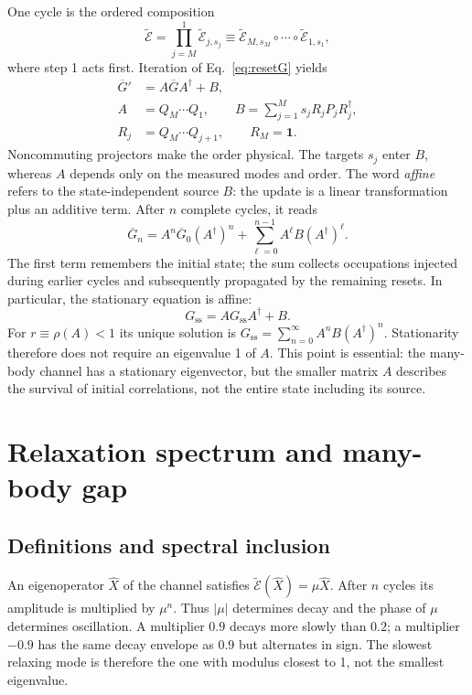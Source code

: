 \documentclass[aps,prb,onecolumn,nofootinbib,superscriptaddress,floatfix]{revtex4-2}
\newcommand{\id}{\mathbf 1}
\newcommand{\E}{\widetilde{\mathcal E}}
\newcommand{\steady}{\mathrm{ss}}
\begin{document}
One cycle is the ordered composition
\begin{equation}
 \E=\prod_{j=M}^{1}\E_{j,s_j}
   \equiv\E_{M,s_M}\circ\cdots\circ\E_{1,s_1},
 \label{eq:product}
\end{equation}
where step 1 acts first. Iteration of Eq.~\eqref{eq:resetG} yields
\begin{align}
 \overline G'&=A\overline GA^\dagger+B,\nonumber\\
 A&=Q_M\cdots Q_1,\qquad
 B=\sum_{j=1}^{M}s_jR_jP_jR_j^\dagger,\nonumber\\
 R_j&=Q_M\cdots Q_{j+1},\qquad R_M=\id.
 \label{eq:affine}
\end{align}
Noncommuting projectors make the order physical. The targets $s_j$
enter $B$, whereas $A$ depends only on the measured modes and order.
The word \emph{affine} refers to the state-independent source $B$:
the update is a linear transformation plus an additive term.
After $n$ complete cycles, it reads
\begin{equation}
 \overline G_n=A^n\overline G_0(A^\dagger)^n+
       \sum_{\ell=0}^{n-1}A^\ell B(A^\dagger)^\ell .
 \label{eq:finite_cycles}
\end{equation}
The first term remembers the initial state; the sum collects
occupations injected during earlier cycles and subsequently
propagated by the remaining resets.
In particular, the stationary equation is affine:
\begin{equation}
 G_\steady=AG_\steady A^\dagger+B. \label{eq:fixedG}
\end{equation}
For $r\equiv\rho(A)<1$ its unique solution is
$G_\steady=\sum_{n=0}^{\infty}A^nB(A^\dagger)^n$.
Stationarity therefore does not require an eigenvalue 1 of $A$.
This point is essential: the many-body channel has a stationary
eigenvector, but the smaller matrix $A$ describes the survival of
initial correlations, not the entire state including its source.

\section{Relaxation spectrum and many-body gap}
\label{sec:spectrum}
\subsection{Definitions and spectral inclusion}
An eigenoperator $\hat X$ of the channel satisfies
$\E(\hat X)=\mu\hat X$. After $n$ cycles its amplitude is multiplied
by $\mu^n$. Thus $|\mu|$ determines decay and the phase of $\mu$
determines oscillation. A multiplier $0.9$ decays more slowly than
$0.2$; a multiplier $-0.9$ has the same decay envelope as $0.9$
but alternates in sign. The slowest relaxing mode is therefore the
one with modulus closest to 1, not the smallest eigenvalue.
\end{document}
